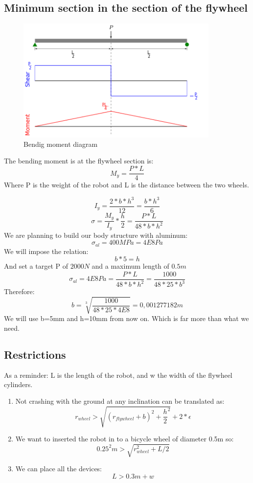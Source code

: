 \subsection{Minimum section in the section of the flywheel}
\begin{figure}[ht]
	\centering
	\includegraphics[width=10cm]{img/Shear_Moment_Diagram.png}
	\caption{Bendig moment diagram}
	\label{fig:Bendig moment diagram}
\end{figure}
The bending moment is at the flywheel section is:
\[M_y = \frac{P * L}{4}\]
Where P is the weight of the robot and L is the distance between the two wheels.



\[I_y = \frac{2*b*h^3}{12}=\frac{b*h^3}{6}\]
\[\sigma=\frac{M_y}{I_y}*\frac{h}{2} = \frac{P*L}{48*b*h^2}\]
We are planning to build our body structure with aluminum:
\[\sigma_{al} = 400MPa = 4E8Pa\]
We will impose the relation:
\[b * 5 = h\]
And set a target P of $2000N$ and a maximum length of $0.5m$
\[\sigma_{al} = 4E8Pa = \frac{P*L}{48*b*h^2} = \frac{1000}{48*25*b^3} \]
Therefore:
\[b = \sqrt[3]{\frac{1000}{48*25*4E8}} = 0,001277182 m\]
We will use b=5mm and h=10mm from now on. Which is far more than what we need.
 
\subsection{Restrictions}
As a reminder: L is the length of the robot, and w the width of the flywheel cylinders.
\begin{enumerate}
\item Not crashing with the ground at any inclination can be translated as:
\[r_{wheel}> \sqrt{(r_{flywheel} + b)^2+\frac{h}{2}^2} + 2*\epsilon\]
\item We want to inserted the robot in to a bicycle wheel of diameter 0.5m so:
\[0.25^2 m > \sqrt{r_{wheel}^2 + L/2}\]
\item We can place all the devices:
\[L > 0.3m + w \]
\end{enumerate}

